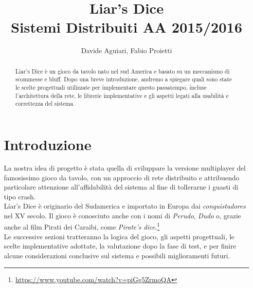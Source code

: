 \documentclass{llncs}
\begin{document}
	\mainmatter              %
	\title{Liar's Dice\\Sistemi Distribuiti AA 2015/2016}
	\author{Davide Aguiari, Fabio Proietti}
	\maketitle
	\begin{abstract}%
		Liar's Dice è un gioco da tavolo nato nel sud America e basato su un meccanismo di scommesse e bluff. Dopo una breve introduzione, andremo a spiegare quali sono state le scelte progettuali utilizzate per implementare questo passatempo, incluse l'architettura della rete, le librerie implementative e gli aspetti legati alla usabilità e correttezza del sistema.
		
	\end{abstract}

	\section{Introduzione}%
		La nostra idea di progetto è stata quella di sviluppare la versione multiplayer del  famosissimo gioco da tavolo, con un approccio di rete distribuito e attribuendo particolare attenzione all'affidabilità del sistema al fine di tollerarne i guasti di tipo crash. \\
		Liar's Dice \cite{wikiDice} è originario del Sudamerica e importato in Europa dai \textit{conquistadores} nel XV secolo. Il gioco è conosciuto anche con i nomi di \textit{Perudo}, \textit{Dudo} o, grazie anche al film Pirati dei Caraibi, come \textit{Pirate's dice}.\footnote[1]{\url{https://www.youtube.com/watch?v=piGg5ZrmoQA}}\\
		Le successive sezioni tratteranno la logica del gioco, gli aspetti progettuali, le scelte implementative adottate, la valutazione dopo la fase di test, e per finire alcune considerazioni conclusive sul sistema e possibili miglioramenti futuri.
\end{document}
